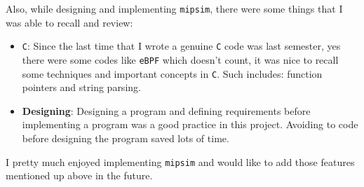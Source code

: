 \documentclass{homework}
\begin{document}
Also, while designing and implementing \texttt{mipsim}, there were some things that I was able to recall and review:
\begin{itemize}
    \item \texttt{C}: Since the last time that I wrote a genuine \texttt{C} code was last semester, yes there were some codes like \texttt{eBPF} which doesn't count, it was nice to recall some techniques and important concepts in \texttt{C}. Such includes: function pointers and string parsing.
    \item \textbf{Designing}: Designing a program and defining requirements before implementing a program was a good practice in this project. Avoiding to code before designing the program saved lots of time.
\end{itemize}

I pretty much enjoyed implementing \texttt{mipsim} and would like to add those features mentioned up above in the future. 
\end{document}
